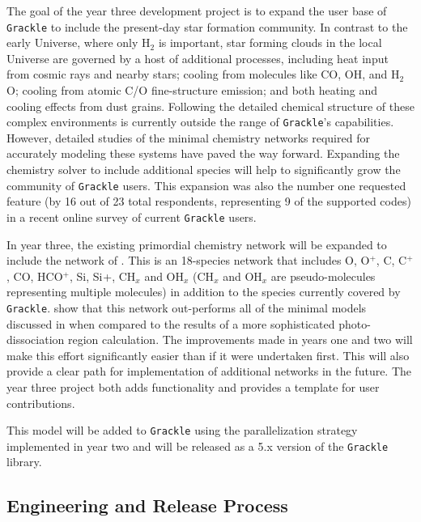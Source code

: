 \documentclass[11pt]{article}
\newcommand{\grackle}{\texttt{Grackle}}
\begin{document}
\begin{flushleft}
The goal of the year three development project is to expand the user
base of \grackle{} to include the present-day star formation
community.  
In contrast to the early Universe, where only H$_{2}$ is important,
star forming clouds in the local Universe are governed by a host of
additional processes, including heat input from cosmic rays and nearby
stars; cooling from molecules like CO, OH, and H$_{2}$O; cooling from
atomic C/O fine-structure emission; and both heating and cooling
effects from dust grains.  Following the detailed chemical structure
of these complex environments is currently outside the range of
\grackle{}'s capabilities.  However, detailed studies of the minimal
chemistry networks required for accurately modeling these systems
\citep{2012MNRAS.421..116G, 2016arXiv161009023G} have paved the way
forward.  Expanding the chemistry solver to include additional species
will help to significantly grow the community of \grackle{} users.
This expansion was also the number one requested feature (by 16 out of
23 total respondents, representing 9 of the supported codes) in a
recent online survey of current \grackle{} users.

In year three, the existing primordial chemistry network will be
expanded to include the network of \citet{2016arXiv161009023G}.  This
is an 18-species network that includes O, O$^{+}$, C, C$^{+}$, CO,
HCO$^{+}$, Si, Si$^{}$+, CH$_{x}$ and OH$_{x}$ (CH$_{x}$ and OH$_{x}$
are pseudo-molecules representing multiple molecules) in addition to
the species currently covered by \grackle{}.
\citet{2016arXiv161009023G} show that this network out-performs all of
the minimal models discussed in \citep{2012MNRAS.421..116G} when
compared to the results of a more sophisticated photo-dissociation
region calculation.  The improvements made in years one and two will
make this effort significantly easier than if it were undertaken
first.  This will also provide a clear path for implementation of
additional networks in the future.  The year three project both adds
functionality and provides a template for user contributions.

This model will be added to \grackle{} using the parallelization
strategy implemented in year two and will be released as a 5.x version
of the \grackle{} library.

\subsection{Engineering and Release Process}


\end{flushleft}
\end{document}
